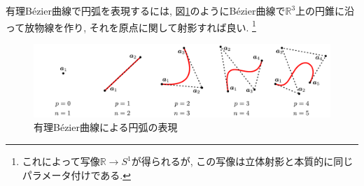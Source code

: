 \documentclass{jsarticle}
\theoremstyle{definition}%
\begin{document}
\newpage
有理B\'ezier曲線で円弧を表現するには, 図\ref{Fig202}のようにB\'ezier曲線で$\mathbb{R}^3$上の円錐に沿って放物線を作り, それを原点に関して射影すれば良い.%
\footnote{これによって写像$\mathbb{R}\to S^1$が得られるが, この写像は立体射影と本質的に同じパラメータ付けである.}
\addtocounter{footnote}{-1}
\begin{figure}[H]
	\centering
    \includegraphics[page=5,clip,width=160mm]{fig.pdf}
	\caption{有理B\'ezier曲線による円弧の表現\protect \footnotemark}
	\label{Fig202}
\end{figure}
\end{document}
